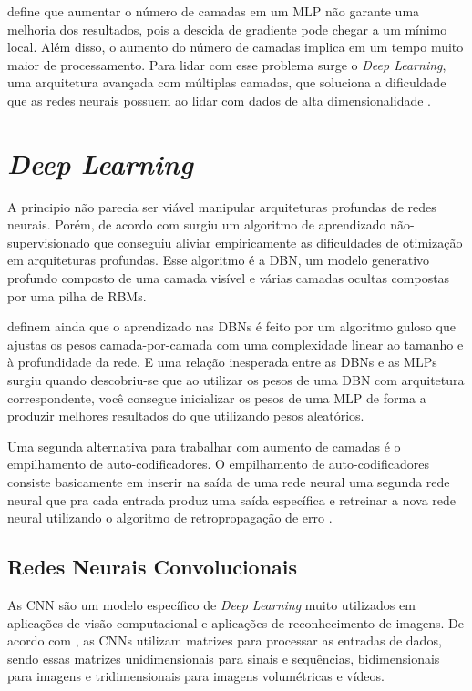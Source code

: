  define que aumentar o número de camadas em um \ac{MLP} não garante uma melhoria dos resultados, pois a descida de gradiente pode chegar a um mínimo local. Além disso, o aumento do número de camadas implica em um tempo muito maior de processamento. Para lidar com esse problema surge o \emph{Deep Learning}, uma arquitetura avançada com múltiplas camadas, que soluciona a dificuldade que as redes neurais possuem ao lidar com dados de alta dimensionalidade \cite{arnold-2011}.

\section{\textit{Deep Learning}}
\label{secao:2:3}


A principio não parecia ser viável manipular arquiteturas profundas de redes neurais. Porém, de acordo com  surgiu um algoritmo de aprendizado não-supervisionado que conseguiu aliviar empiricamente as dificuldades de otimização em arquiteturas profundas. Esse algoritmo é a \ac{DBN}, um modelo generativo profundo composto de uma camada visível e várias camadas ocultas compostas por uma pilha de \ac{RBM}s.

 definem ainda que o aprendizado nas \ac{DBN}s é feito por um algoritmo guloso que ajustas os pesos camada-por-camada com uma complexidade linear ao tamanho e à profundidade da rede. E uma relação inesperada entre as \ac{DBN}s e as \ac{MLP}s surgiu quando descobriu-se que ao utilizar os pesos de uma \ac{DBN} com arquitetura correspondente, você consegue inicializar os pesos de uma \ac{MLP} de forma a produzir melhores resultados do que utilizando pesos aleatórios.

Uma segunda alternativa para trabalhar com aumento de camadas é o empilhamento de auto-codificadores. O empilhamento de auto-codificadores consiste basicamente em inserir na saída de uma rede neural uma segunda rede neural que pra cada entrada produz uma saída específica e retreinar a nova rede neural utilizando o algoritmo de retropropagação de erro \cite{deng-2014}.

\subsection{Redes Neurais Convolucionais}
\label{subsecao:2:3:1}


As \ac{CNN} são um modelo específico de \textit{Deep Learning} muito utilizados em aplicações de visão computacional e aplicações de reconhecimento de imagens. De acordo com , as \ac{CNN}s utilizam matrizes para processar as entradas de dados, sendo essas matrizes unidimensionais para sinais e sequências, bidimensionais para imagens e tridimensionais para imagens volumétricas e vídeos. 

